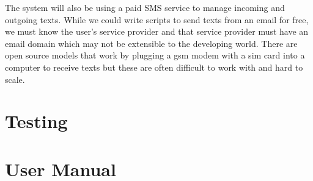 The system will also be using a paid SMS service to manage incoming and outgoing texts. While we could write scripts to send texts from an email for free, we must know the user’s service provider and that service provider must have an email domain which may not be extensible to the developing world. There are open source models that work by plugging a gsm modem with a sim card into a computer to receive texts but these are often difficult to work with and hard to scale.

\section{Testing}

\section{User Manual}

